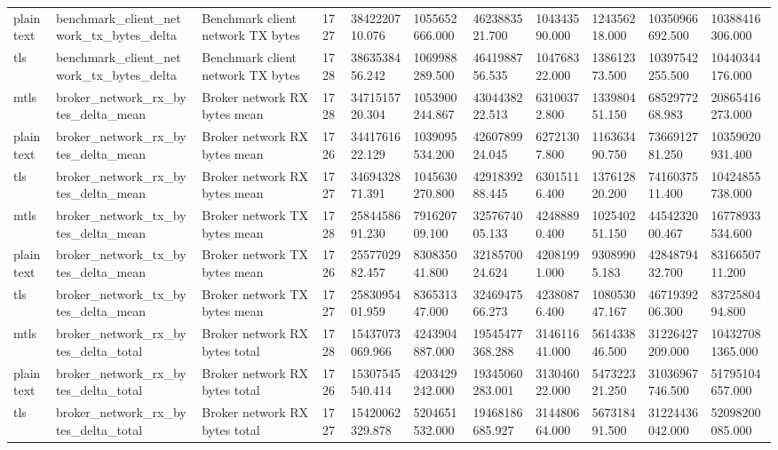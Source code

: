 \begin{longtable}{lllllllllll}
plaintext & benchmark\_client\_network\_tx\_bytes\_delta & Benchmark client network TX bytes & 1727 & 3842220710.076 & 1055652666.000 & 4623883521.700 & 104343590.000 & 124356218.000 & 10350966692.500 & 10388416306.000 \\
tls & benchmark\_client\_network\_tx\_bytes\_delta & Benchmark client network TX bytes & 1728 & 3863538456.242 & 1069988289.500 & 4641988756.535 & 104768322.000 & 138612373.500 & 10397542255.500 & 10440344176.000 \\
mtls & broker\_network\_rx\_bytes\_delta\_mean & Broker network RX bytes mean & 1728 & 3471515720.304 & 1053900244.867 & 4304438222.513 & 63100372.800 & 133980451.150 & 6852977268.983 & 20865416273.000 \\
plaintext & broker\_network\_rx\_bytes\_delta\_mean & Broker network RX bytes mean & 1726 & 3441761622.129 & 1039095534.200 & 4260789924.045 & 62721307.800 & 116363490.750 & 7366912781.250 & 10359020931.400 \\
tls & broker\_network\_rx\_bytes\_delta\_mean & Broker network RX bytes mean & 1727 & 3469432871.391 & 1045630270.800 & 4291839288.445 & 63015116.400 & 137612820.200 & 7416037511.400 & 10424855738.000 \\
mtls & broker\_network\_tx\_bytes\_delta\_mean & Broker network TX bytes mean & 1728 & 2584458691.230 & 791620709.100 & 3257674005.133 & 42488890.400 & 102540251.150 & 4454232000.467 & 16778933534.600 \\
plaintext & broker\_network\_tx\_bytes\_delta\_mean & Broker network TX bytes mean & 1726 & 2557702982.457 & 830835041.800 & 3218570024.624 & 42081991.000 & 93089905.183 & 4284879432.700 & 8316650711.200 \\
tls & broker\_network\_tx\_bytes\_delta\_mean & Broker network TX bytes mean & 1727 & 2583095401.959 & 836531347.000 & 3246947566.273 & 42380876.400 & 108053047.167 & 4671939206.300 & 8372580494.800 \\
mtls & broker\_network\_rx\_bytes\_delta\_total & Broker network RX bytes total & 1728 & 15437073069.966 & 4243904887.000 & 19545477368.288 & 314611641.000 & 561433846.500 & 31226427209.000 & 104327081365.000 \\
plaintext & broker\_network\_rx\_bytes\_delta\_total & Broker network RX bytes total & 1726 & 15307545540.414 & 4203429242.000 & 19345060283.001 & 313046022.000 & 547322321.250 & 31036967746.500 & 51795104657.000 \\
tls & broker\_network\_rx\_bytes\_delta\_total & Broker network RX bytes total & 1727 & 15420062329.878 & 5204651532.000 & 19468186685.927 & 314480664.000 & 567318491.500 & 31224436042.000 & 52098200085.000 \\

\end{longtable}
